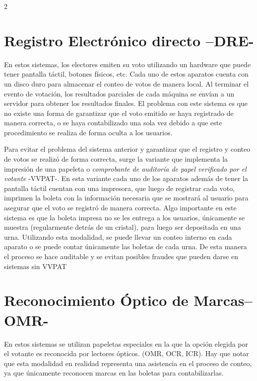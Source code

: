 \documentclass[12pt,spanish,Letterpaper,openany]{book}
\begin{document}
\begin {multicols}{2}
\hypertarget{registro-electronico-directo-dre-}{%
\section{Registro Electrónico directo --DRE-}\label{registro-electronico-directo-dre-}}

En estos sistemas, los electores emiten su voto utilizando un hardware que puede tener pantalla táctil, botones físicos, etc. Cada uno de estos aparatos cuenta con un disco duro para almacenar el conteo de votos de manera local. Al terminar el evento de votación, los resultados parciales de cada máquina se envían a un servidor para obtener los resultados finales. El problema con este sistema es que no existe una forma de garantizar que el voto emitido se haya registrado de manera correcta, o se haya contabilizado una sola vez debido a que este procedimiento se realiza de forma oculta a los usuarios.

Para evitar el problema del sistema anterior y garantizar que el registro y conteo de votos se realizó de forma correcta, surge la variante que implementa la impresión de una papeleta o \emph{comprobante de auditoría de papel verificado por el votante} -VVPAT-. En esta variante cada uno de los aparatos además de tener la pantalla táctil cuentan con una impresora, que luego de registrar cada voto, imprimen la boleta con la información necesaria que se mostrará al usuario para asegurar que el voto se registró de manera correcta. Algo importante en este sistema es que la boleta impresa no se les entrega a los usuarios, únicamente se muestra (regularmente detrás de un cristal), para luego ser depositada en una urna. Utilizando esta modalidad, se puede llevar un conteo interno en cada aparato o se puede contar únicamente las boletas de cada urna. De esta manera el proceso se hace auditable y se evitan posibles fraudes que pueden darse en sistemas sin VVPAT

\hypertarget{reconocimiento-optico-de-marcasomr-}{%
\section{Reconocimiento Óptico de Marcas--OMR-}\label{reconocimiento-optico-de-marcasomr-}}

En estos sistemas se utilizan papeletas especiales en la que la opción elegida por el votante es reconocida por lectores ópticos. (OMR, OCR, ICR). Hay que notar que esta modalidad en realidad representa una asistencia en el proceso de conteo, ya que únicamente reconocen marcas en las boletas para contabilizarlas.


\end{multicols}
\end{document}
